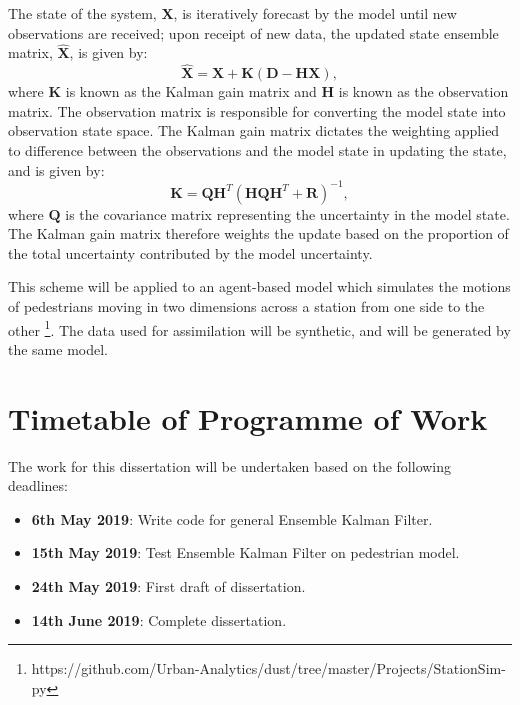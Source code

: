 \documentclass[12pt, twoside, a4paper]{article}
\begin{document}
The state of the system, $\mathbf{X}$, is iteratively forecast by the model until
new observations are received; upon receipt of new data, the updated state
ensemble matrix, $\hat{\mathbf{X}}$, is given by:
\begin{equation}
    \hat{\mathbf{X}} = \mathbf{X} + \mathbf{K}
                       \left(
                       \mathbf{D} - \mathbf{H} \mathbf{X}
                       \right),
\end{equation}
where $\mathbf{K}$ is known as the Kalman gain matrix and $\mathbf{H}$ is known
as the observation matrix.
The observation matrix is responsible for converting the model state into
observation state space.
The Kalman gain matrix dictates the weighting applied to difference between the
observations and the model state in updating the state, and is given by:
\begin{equation}
    \mathbf{K} = \mathbf{Q} \mathbf{H}^T
                 {\left(
                    \mathbf{H} \mathbf{Q} \mathbf{H}^T + \mathbf{R}
                 \right)} ^ {-1},
\end{equation}
where $\mathbf{Q}$ is the covariance matrix representing the uncertainty in the
model state.
The Kalman gain matrix therefore weights the update based on the proportion of
the total uncertainty contributed by the model uncertainty.

This scheme will be applied to an agent-based model which simulates the motions
of pedestrians moving in two dimensions across a station from one side to the
other
\footnote{https://github.com/Urban-Analytics/dust/tree/master/Projects/StationSim-py}.
The data used for assimilation will be synthetic, and will be generated by the
same model.

\section{Timetable of Programme of Work}\label{sec:timetable}


The work for this dissertation will be undertaken based on the following
deadlines:
\begin{itemize}
    \item \textbf{6th May 2019}: Write code for general Ensemble Kalman Filter.
    \item \textbf{15th May 2019}: Test Ensemble Kalman Filter on pedestrian model.
    \item \textbf{24th May 2019}: First draft of dissertation.
    \item \textbf{14th June 2019}: Complete dissertation.
\end{itemize}
\end{document}
